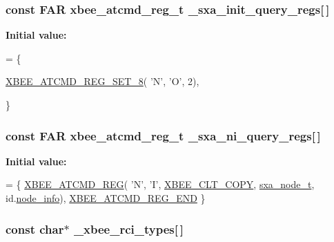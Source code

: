 \hypertarget{group___s_x_a_gaa4c14a57419394312307388b4fde4a0f}{
\subsubsection[{\-\_\-sxa\-\_\-init\-\_\-query\-\_\-regs}]{\setlength{\rightskip}{0pt plus 5cm}const {\bf F\-A\-R} {\bf xbee\-\_\-atcmd\-\_\-reg\-\_\-t} \-\_\-sxa\-\_\-init\-\_\-query\-\_\-regs\mbox{[}$\,$\mbox{]}}}\label{group___s_x_a_gaa4c14a57419394312307388b4fde4a0f}
{\bfseries Initial value\-:}
\begin{DoxyCode}
= \{
   
   \hyperlink{group__xbee__atcmd_ga37dcc1cfc854d7876be99eff279bf2a0}{XBEE\_ATCMD\_REG\_SET\_8}( \textcolor{charliteral}{'N'}, \textcolor{charliteral}{'O'}, 2),

\}
\end{DoxyCode}
\hypertarget{group___s_x_a_ga935f2ece9e3b939de8cf5b0a223d5346}{
\subsubsection[{\-\_\-sxa\-\_\-ni\-\_\-query\-\_\-regs}]{\setlength{\rightskip}{0pt plus 5cm}const {\bf F\-A\-R} {\bf xbee\-\_\-atcmd\-\_\-reg\-\_\-t} \-\_\-sxa\-\_\-ni\-\_\-query\-\_\-regs\mbox{[}$\,$\mbox{]}}}\label{group___s_x_a_ga935f2ece9e3b939de8cf5b0a223d5346}
{\bfseries Initial value\-:}
\begin{DoxyCode}
= \{
   \hyperlink{group__xbee__atcmd_gaafe33c3d8ea48b42b25d1183eaf93071}{XBEE\_ATCMD\_REG}( \textcolor{charliteral}{'N'}, \textcolor{charliteral}{'I'}, \hyperlink{group__xbee__atcmd_gga1bd8ecd38c107579d20ded3c79a7d70baef8d715c8725d801676943b868508633}{XBEE\_CLT\_COPY}, 
      \hyperlink{structsxa__node__t}{sxa\_node\_t}, \textcolor{keywordtype}{id}.\hyperlink{group__xbee__discovery_gaa667bab3abb953bc14d9f5bcc36644b8}{node\_info}),
   \hyperlink{group__xbee__atcmd_ga22fe547f7ae9fd0b090c5e45f03c162d}{XBEE\_ATCMD\_REG\_END}
\}
\end{DoxyCode}
\hypertarget{group___s_x_a_ga62238d483c628f8c996664ff0f47ccef}{
\subsubsection[{\-\_\-xbee\-\_\-rci\-\_\-types}]{\setlength{\rightskip}{0pt plus 5cm}const char$\ast$ \-\_\-xbee\-\_\-rci\-\_\-types\mbox{[}$\,$\mbox{]}}}\label{group___s_x_a_ga62238d483c628f8c996664ff0f47ccef}
